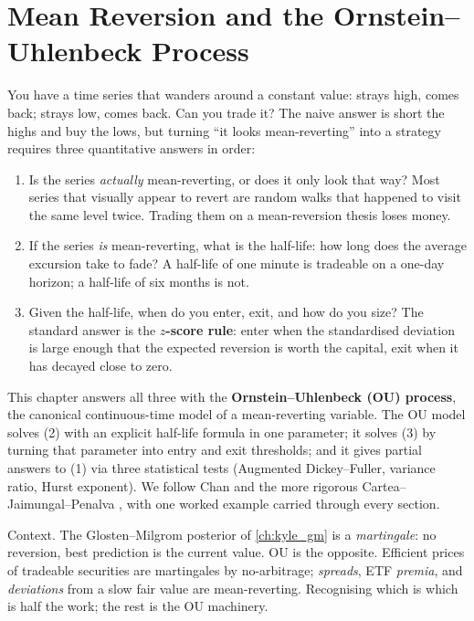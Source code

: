 \chapter{Mean Reversion and the Ornstein--Uhlenbeck Process}
\label{ch:mean_reversion_ou}

You have a time series that wanders around a constant value:
strays high, comes back; strays low, comes back. Can you trade
it? The naive answer is short the highs and buy the lows, but
turning ``it looks mean-reverting'' into a strategy requires
three quantitative answers in order:
\begin{enumerate}
  \item Is the series \emph{actually} mean-reverting, or does it
  only look that way? Most series that visually appear to revert
  are random walks that happened to visit the same level twice.
  Trading them on a mean-reversion thesis loses money.
  \item If the series \emph{is} mean-reverting, what is the
  half-life: how long does the average excursion take to fade?
  A half-life of one minute is tradeable on a one-day horizon; a
  half-life of six months is not.
  \item Given the half-life, when do you enter, exit, and how do
  you size? The standard answer is the \textbf{$z$-score rule}:
  enter when the standardised deviation is large enough that the
  expected reversion is worth the capital, exit when it has
  decayed close to zero.
\end{enumerate}
This chapter answers all three with the
\textbf{Ornstein--Uhlenbeck (OU) process}, the canonical
continuous-time model of a mean-reverting variable. The OU model
solves (2) with an explicit half-life formula in one parameter;
it solves (3) by turning that parameter into entry and exit
thresholds; and it gives partial answers to (1) via three
statistical tests (Augmented Dickey--Fuller, variance ratio, Hurst
exponent). We follow Chan \citeChan{} and the more rigorous
Cartea--Jaimungal--Penalva \citeCartea{}, with one worked example
carried through every section.

Context. The Glosten--Milgrom posterior of \cref{ch:kyle_gm} is
a \emph{martingale}: no reversion, best prediction is the current
value. OU is the opposite. Efficient prices of tradeable
securities are martingales by no-arbitrage; \emph{spreads},
ETF \emph{premia}, and \emph{deviations} from a slow fair value
are mean-reverting. Recognising which is which is half the work;
the rest is the OU machinery.

